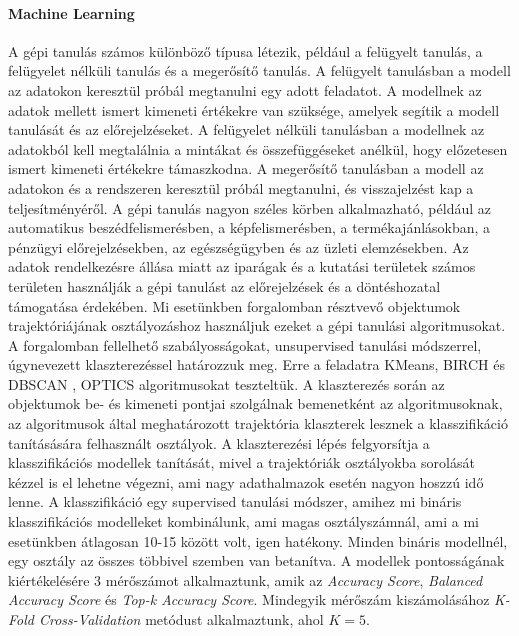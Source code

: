 \documentclass[12pt,a4paper]{article}
\begin{document}
\paragraph{Machine Learning} A gépi tanulás számos különböző típusa létezik, például a felügyelt tanulás, a felügyelet nélküli tanulás és a megerősítő tanulás. A felügyelt tanulásban a modell az adatokon keresztül próbál megtanulni egy adott feladatot. A modellnek az adatok mellett ismert kimeneti értékekre van szüksége, amelyek segítik a modell tanulását és az előrejelzéseket. A felügyelet nélküli tanulásban a modellnek az adatokból kell megtalálnia a mintákat és összefüggéseket anélkül, hogy előzetesen ismert kimeneti értékekre támaszkodna. A megerősítő tanulásban a modell az adatokon és a rendszeren keresztül próbál megtanulni, és visszajelzést kap a teljesítményéről.
A gépi tanulás nagyon széles körben alkalmazható, például az automatikus beszédfelismerésben, a képfelismerésben, a termékajánlásokban, a pénzügyi előrejelzésekben, az egészségügyben és az üzleti elemzésekben. Az adatok rendelkezésre állása miatt az iparágak és a kutatási területek számos területen használják a gépi tanulást az előrejelzések és a döntéshozatal támogatása érdekében.
Mi esetünkben forgalomban résztvevő objektumok trajektóriájának osztályozáshoz használjuk ezeket a gépi tanulási algoritmusokat.
A forgalomban fellelhető szabályosságokat, unsupervised tanulási módszerrel, úgynevezett klaszterezéssel határozzuk meg. Erre a feladatra KMeans, BIRCH \cite{10.1145/233269.233324} és DBSCAN \cite{10.5555/3001460.3001507}\cite{10.1145/3068335}, OPTICS \cite{10.1145/304181.304187} algoritmusokat teszteltük.
A klaszterezés során az objektumok be- és kimeneti pontjai szolgálnak bemenetként az algoritmusoknak, az algoritmusok által meghatározott trajektória klaszterek lesznek a klasszifikáció tanításására felhasznált osztályok.
A klaszterezési lépés felgyorsítja a klasszifikációs modellek tanítását, mivel a trajektóriák osztályokba sorolását kézzel is el lehetne végezni, ami nagy adathalmazok esetén nagyon hoszzú idő lenne.
A klasszifikáció egy supervised tanulási módszer, amihez mi bináris klasszifikációs modelleket kombinálunk, ami magas osztályszámnál, ami a mi esetünkben átlagosan 10-15 között volt, igen hatékony. Minden bináris modellnél, egy osztály az összes többivel szemben van betanítva. A modellek pontosságának kiértékelésére 3 mérőszámot alkalmaztunk, amik az \emph{Accuracy Score}, \emph{Balanced Accuracy Score} \cite{10.1109/ICPR.2010.764} és \emph{Top-k Accuracy Score}.
Mindegyik mérőszám kiszámolásához \emph{K-Fold Cross-Validation} \cite{Anguita2012TheI} metódust alkalmaztunk, ahol \begin{math}K=5\end{math}.
\end{document}
